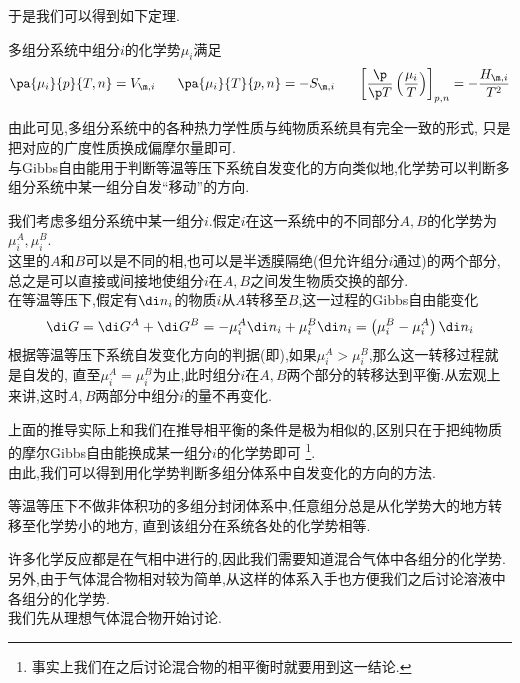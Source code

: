 \documentclass{ctexart}
\begin{document}
于是我们可以得到如下定理.
\begin{theorem}[4B.3.3 化学势与温度和压力的关系]
    多组分系统中组分$i$的化学势$\mu_i$满足
    \[\pa{\mu_i}{p}{T,n}=V_{\m,i}\ \ \ \ \ \pa{\mu_i}{T}{p,n}=-S_{\m,i}\ \ \ \ \ \left[\dfrac{\p}{\p T}\left(\dfrac{\mu_i}{T}\right)\right]_{p,n}=-\dfrac{H_{\m,i}}{T^2}\]

\end{theorem}
由此可见,多组分系统中的各种热力学性质与纯物质系统具有完全一致的形式,%
只是把对应的广度性质换成偏摩尔量即可.\vspace{4pt}\\
\indent 与Gibbs自由能用于判断等温等压下系统自发变化的方向类似地,化学势可以判断多组分系统中某一组分自发“移动”的方向.
\begin{derivation}
    我们考虑多组分系统中某一组分$i$.假定$i$在这一系统中的不同部分$A,B$的化学势为$\mu_i^A,\mu_i^B$.\\
    这里的$A$和$B$可以是不同的相,也可以是半透膜隔绝(但允许组分$i$通过)的两个部分,%
    总之是可以直接或间接地使组分$i$在$A,B$之间发生物质交换的部分.\\
    在等温等压下,假定有$\di n_i$的物质$i$从$A$转移至$B$,这一过程的Gibbs自由能变化
    \[\di G=\di G^A+\di G^B=-\mu_i^A\di n_{i}+\mu_i^B\di n_i=\left(\mu_i^B-\mu_i^A\right)\di n_i\]
    根据等温等压下系统自发变化方向的判据(即),如果$\mu_i^A>\mu_i^B$,那么这一转移过程就是自发的,%
    直至$\mu_i^A=\mu_i^B$为止,此时组分$i$在$A,B$两个部分的转移达到平衡.从宏观上来讲,这时$A,B$两部分中组分$i$的量不再变化.
\end{derivation}
上面的推导实际上和我们在推导相平衡的条件是极为相似的,区别只在于把纯物质的摩尔Gibbs自由能换成某一组分$i$的化学势即可%
\footnote{事实上我们在之后讨论混合物的相平衡时就要用到这一结论.}.\\
\indent 由此,我们可以得到用化学势判断多组分体系中自发变化的方向的方法.
\begin{theorem}[4B.3.4 多组分体系自发变化的方向]
    等温等压下不做非体积功的多组分封闭体系中,任意组分总是从化学势大的地方转移至化学势小的地方,%
    直到该组分在系统各处的化学势相等.
\end{theorem}
\vspace{8pt}
\indent 许多化学反应都是在气相中进行的,因此我们需要知道混合气体中各组分的化学势.%
另外,由于气体混合物相对较为简单,从这样的体系入手也方便我们之后讨论溶液中各组分的化学势.\\
\indent 我们先从理想气体混合物开始讨论.\vspace{4pt}\\
\end{document}
